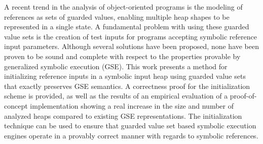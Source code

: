 A recent trend in the analysis of object-oriented programs is the
modeling of references as sets of guarded values, enabling multiple
heap shapes to be represented in a single state. A fundamental problem
with using these guarded value sets is the creation of test inputs for
programs accepting symbolic reference input parameters. Although
several solutions have been proposed, none have been proven to be
sound and complete with respect to the properties provable by
generalized symbolic execution (GSE). This work presents a method for
initializing reference inputs in a symbolic input heap using guarded
value sets that exactly preserves GSE semantics. A correctness proof
for the initialization scheme is provided, as well as the results of
an empirical evaluation of a proof-of-concept implementation showing a real increase in the size and number of analyzed heaps compared to existing GSE representations. The
initialization technique can be used to ensure that guarded value set
based symbolic execution engines operate in a provably correct manner
with regards to symbolic references.



